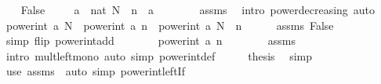 \begin{isabellebody}
\ \ \isamarkupfalse%
\ False\isanewline
\ \ \isamarkupfalse%
\ {\isacharasterisk}{\kern0pt}{\isacharcolon}{\kern0pt}\ {\isachardoublequoteopen}a\ {\isacharcircum}{\kern0pt}\ nat\ {\isacharparenleft}{\kern0pt}N\ {\isacharminus}{\kern0pt}\ n{\isacharparenright}{\kern0pt}\ {\isasymle}\ a\ {\isacharcircum}{\kern0pt}\ {}{\isachardoublequoteclose}\isanewline
\ \ \ \ \isamarkupfalse%
\ assms\ \isamarkupfalse%
\ {\isacharparenleft}{\kern0pt}intro\ power{\isacharunderscore}{\kern0pt}decreasing{\isacharparenright}{\kern0pt}\ auto\isanewline
\ \ \isamarkupfalse%
\ {\isachardoublequoteopen}power{\isacharunderscore}{\kern0pt}int\ a\ N\ {\isacharequal}{\kern0pt}\ power{\isacharunderscore}{\kern0pt}int\ a\ n\ {\isacharasterisk}{\kern0pt}\ power{\isacharunderscore}{\kern0pt}int\ a\ {\isacharparenleft}{\kern0pt}N\ {\isacharminus}{\kern0pt}\ n{\isacharparenright}{\kern0pt}{\isachardoublequoteclose}\isanewline
\ \ \ \ \isamarkupfalse%
\ assms\ False\ \isamarkupfalse%
\ {\isacharparenleft}{\kern0pt}simp\ flip{\isacharcolon}{\kern0pt}\ power{\isacharunderscore}{\kern0pt}int{\isacharunderscore}{\kern0pt}add{\isacharparenright}{\kern0pt}\isanewline
\ \ \isamarkupfalse%
\ \isamarkupfalse%
\ {\isachardoublequoteopen}{\isasymdots}\ {\isasymle}\ power{\isacharunderscore}{\kern0pt}int\ a\ n\ {\isacharasterisk}{\kern0pt}\ {}{\isachardoublequoteclose}\isanewline
\ \ \ \ \isamarkupfalse%
\ assms\ {\isacharasterisk}{\kern0pt}\ \isamarkupfalse%
\ {\isacharparenleft}{\kern0pt}intro\ mult{\isacharunderscore}{\kern0pt}left{\isacharunderscore}{\kern0pt}mono{\isacharparenright}{\kern0pt}\ {\isacharparenleft}{\kern0pt}auto\ simp{\isacharcolon}{\kern0pt}\ power{\isacharunderscore}{\kern0pt}int{\isacharunderscore}{\kern0pt}def{\isacharparenright}{\kern0pt}\isanewline
\ \ \isamarkupfalse%
\ \isamarkupfalse%
\ {\isacharquery}{\kern0pt}thesis\ \isamarkupfalse%
\ simp\isanewline
{}\isamarkupfalse%
\ {\isacharparenleft}{\kern0pt}use\ assms\ \ {\isacartoucheopen}auto\ simp{\isacharcolon}{\kern0pt}\ power{\isacharunderscore}{\kern0pt}int{\isacharunderscore}{\kern0pt}{}{\isacharunderscore}{\kern0pt}left{\isacharunderscore}{\kern0pt}If{\isacartoucheclose}{\isacharparenright}{\kern0pt}%
\endisatagproof
{\isafoldproof}%
%
\isadelimproof
\isanewline
%
\endisadelimproof
\isanewline
{}\isamarkupfalse%

\end{isabellebody}
